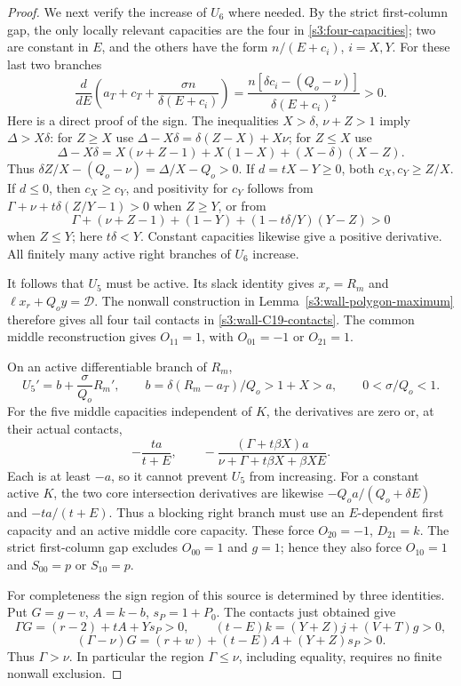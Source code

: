 \documentclass[11pt,reqno]{amsart}
\theoremstyle{definition}
\theoremstyle{remark}
\begin{document}
\begin{proof}
We next verify the increase of \(U_6\) where needed. By the strict
first-column gap, the only locally relevant capacities are the four
in \eqref{s3:four-capacities}; two are constant in \(E\), and the
others have the form \(n/(E+c_i)\), \(i=X,Y\).
For these last two branches
\[
 \frac{d}{dE}\left(a_T+c_T+\frac{\sigma n}{\delta(E+c_i)}\right)
 =\frac{n[\delta c_i-(Q_o-\nu)]}{\delta(E+c_i)^2}>0.
\]
Here is a direct proof of the sign. The inequalities
\(X>\delta\), \(\nu+Z>1\) imply \(\Delta>X\delta\):
for \(Z\ge X\) use
\(\Delta-X\delta=\delta(Z-X)+X\nu\); for \(Z\le X\) use
\[
 \Delta-X\delta=X(\nu+Z-1)+X(1-X)+(X-\delta)(X-Z).
\]
Thus \(\delta Z/X-(Q_o-\nu)=\Delta/X-Q_o>0\).
If \(d=tX-Y\ge0\), both \(c_X,c_Y\ge Z/X\).
If \(d\le0\), then \(c_X\ge c_Y\), and positivity for \(c_Y\)
follows from \(\Gamma+\nu+t\delta(Z/Y-1)>0\) when \(Z\ge Y\),
or from
\[
 \Gamma+(\nu+Z-1)+(1-Y)+(1-t\delta/Y)(Y-Z)>0
\]
when \(Z\le Y\); here \(t\delta<Y\).
Constant capacities likewise give a positive derivative.
All finitely many active right branches of \(U_6\) increase.

It follows that \(U_5\) must be active. Its slack identity gives
\(x_r=R_m\) and \(\ell x_r+Q_oy=\mathcal D\).
The nonwall construction in Lemma~\ref{s3:wall-polygon-maximum}
therefore gives all four tail contacts in
\eqref{s3:wall-C19-contacts}. The common middle reconstruction gives
\(O_{11}=1\), with \(O_{01}=-1\) or \(O_{21}=1\).

On an active differentiable branch of \(R_m\),
\[
 U_5'=b+\frac\sigma{Q_o}R_m',\qquad
 b=\delta(R_m-a_T)/Q_o>1+X>a,\qquad 0<\sigma/Q_o<1.
\]
For the five middle capacities independent of \(K\), the derivatives
are zero or, at their actual contacts,
\[
 -\frac{ta}{t+E},\qquad
 -\frac{(\Gamma+t\beta X)a}{\nu+\Gamma+t\beta X+\beta XE}.
\]
Each is at least \(-a\), so it cannot prevent \(U_5\) from
increasing. For a constant active \(K\), the two core intersection
derivatives are likewise
\(-Q_oa/(Q_o+\delta E)\) and \(-ta/(t+E)\).
Thus a blocking right branch must use an \(E\)-dependent first
capacity and an active middle core capacity. These force
\(O_{20}=-1\), \(D_{21}=k\). The strict first-column gap
excludes \(O_{00}=1\) and \(g=1\); hence they also force
\(O_{10}=1\) and \(S_{00}=p\) or \(S_{10}=p\).

For completeness the sign region of this source is determined by
three identities. Put \(G=g-v\), \(A=k-b\), \(s_P=1+P_0\).
The contacts just obtained give
\[
 \Gamma G=(r-2)+tA+Ys_P>0,\qquad
 (t-E)k=(Y+Z)j+(V+T)g>0,
\]
\[
 (\Gamma-\nu)G=(r+w)+(t-E)A+(Y+Z)s_P>0.
\]
Thus \(\Gamma>\nu\). In particular the region
\(\Gamma\le\nu\), including equality, requires no finite
nonwall exclusion.


\end{proof}
\end{document}
